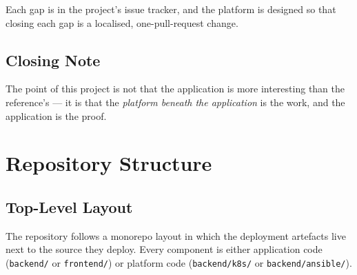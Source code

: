 \documentclass[11pt,a4paper]{article}
\begin{document}
Each gap is in the project's issue tracker, and the platform is
designed so that closing each gap is a localised, one-pull-request
change.

\subsection{Closing Note}
The point of this project is not that the application is more
interesting than the reference's — it is that the \emph{platform
beneath the application} is the work, and the application is the
proof.

\section{Repository Structure}

\subsection{Top-Level Layout}
The repository follows a monorepo layout in which the deployment
artefacts live next to the source they deploy.  Every component is
either application code (\texttt{backend/} or \texttt{frontend/})
or platform code (\texttt{backend/k8s/} or
\texttt{backend/ansible/}).
\end{document}
